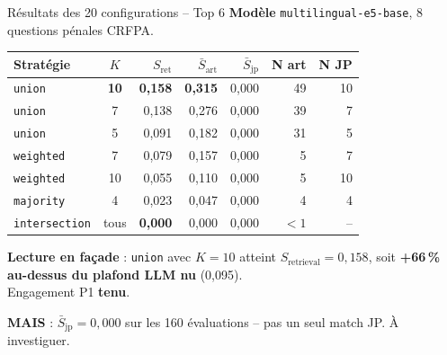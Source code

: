 \documentclass[aspectratio=169,10pt]{beamer}
\newcommand{\warnbox}[1]{%
  \begin{center}
  \colorbox{red!10}{\parbox{0.92\linewidth}{\centering #1}}
  \end{center}}
\newcommand{\okbox}[1]{%
  \begin{center}
  \colorbox{green!10}{\parbox{0.92\linewidth}{\centering #1}}
  \end{center}}
\begin{document}
\begin{frame}{Résultats des 20 configurations -- Top 6}
  \footnotesize
  \textbf{Modèle} \texttt{multilingual-e5-base}, 8 questions pénales CRFPA.

  \vspace{0.4em}
  \renewcommand{\arraystretch}{1.2}
  \begin{tabular}{@{}l c r r r r r@{}}
    \toprule
    \textbf{Stratégie} & \textbf{$K$} & $S_{\text{ret}}$ & $\bar{S}_{\text{art}}$ & $\bar{S}_{\text{jp}}$ & \textbf{N art} & \textbf{N JP} \\
    \midrule
    \rowcolor{green!10}
    \texttt{union}        & \textbf{10} & \textbf{0,158} & \textbf{0,315} & 0,000 & 49 & 10 \\
    \texttt{union}        & 7  & 0,138 & 0,276 & 0,000 & 39 & 7  \\
    \texttt{union}        & 5  & 0,091 & 0,182 & 0,000 & 31 & 5  \\
    \texttt{weighted}     & 7  & 0,079 & 0,157 & 0,000 & 5  & 7  \\
    \texttt{weighted}     & 10 & 0,055 & 0,110 & 0,000 & 5  & 10 \\
    \texttt{majority}     & 4  & 0,023 & 0,047 & 0,000 & 4  & 4  \\
    \midrule
    \texttt{intersection} & tous & \textbf{0,000} & 0,000 & 0,000 & $<1$ & -- \\
    \bottomrule
  \end{tabular}

  \vspace{0.5em}
  \okbox{\textbf{Lecture en façade} : \texttt{union} avec $K=10$ atteint \(S_{\text{retrieval}} = 0{,}158\), soit \textbf{+66\,\% au-dessus du plafond LLM nu} (0,095). \\Engagement P1 \textbf{tenu}.}

  \vspace{0.3em}
  \warnbox{\textbf{MAIS} : $\bar{S}_{\text{jp}} = 0{,}000$ sur les 160 évaluations -- pas un seul match JP. À investiguer.}
\end{frame}
\end{document}
